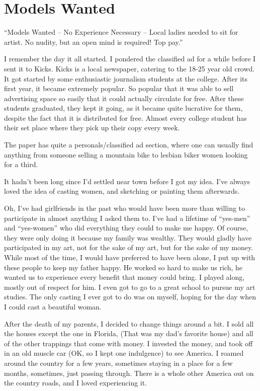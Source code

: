 \chapter{Models Wanted}

``Models Wanted -- No Experience Necessary -- Local ladies needed to sit for artist. No nudity,
but an open mind is required! Top pay.''

I remember the day it all started. I pondered the classified ad for a while before I sent it
to Kicks. Kicks is a local newspaper, catering to the 18-25 year old crowd. It got started by
some enthusiastic journalism students at the college. After its first year, it became extremely
popular. So popular that it was able to sell advertising space so easily that it could actually
circulate for free. After these students graduated, they kept it going, as it became quite
lucrative for them, despite the fact that it is distributed for free. Almost every college
student has their set place where they pick up their copy every week.

    The paper has quite a personals/classified ad section, where one can usually find anything
from someone selling a mountain bike to lesbian biker women looking for a third.

    It hadn't been long since I'd settled near town before I got my idea. I've always loved the
idea of casting women, and sketching or painting them afterwards.

    Oh, I've had girlfriends in the past who would have been more than willing to participate in
almost anything I asked them to. I've had a lifetime of ``yes-men'' and ``yes-women'' who did
everything they could to make me happy. Of course, they were only doing it because my family was
wealthy. They would gladly have participated in my art, not for the sake of my art, but for the
sake of my money. While most of the time, I would have preferred to have been alone, I put up
with these people to keep my father happy. He worked so hard to make us rich, he wanted us to
experience every benefit that money could bring. I played along, mostly out of respect for him.
I even got to go to a great school to pursue my art studies. The only casting I ever got to do
was on myself, hoping for the day when I could cast a beautiful woman.

    After the death of my parents, I decided to change things around a bit. I sold all the
houses except the one in Florida, (That was my dad's favorite house) and all of the other
trappings that come with money. I invested the money, and took off in an old muscle car (OK, so
I kept one indulgence) to see America. I roamed around the country for a few years, sometimes
staying in a place for a few months, sometimes, just passing through. There is a whole other
America out on the country roads, and I loved experiencing it.


